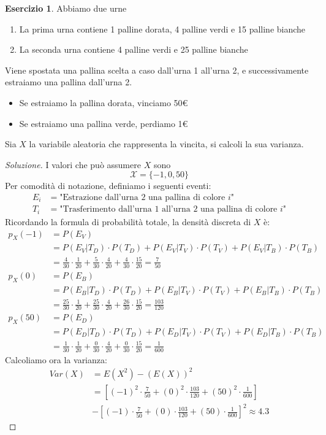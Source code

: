 \documentclass{article}
\theoremstyle{plain}
\theoremstyle{definition}
\newtheorem{esercizio}{Esercizio}[section]
\theoremstyle{remark}
\newenvironment{soluzione}
	{\renewcommand\qedsymbol{$\mathwitch*$}\begin{proof}[Soluzione]}
	{\end{proof}}
\renewcommand{\qedsymbol}{$\mathrightghost$}
\begin{document}
\begin{esercizio}
	Abbiamo due urne
	\begin{enumerate}
		\item La prima urna contiene 1 palline dorata, 4 palline verdi e 15 palline bianche
		\item La seconda urna contiene 4 palline verdi e 25 palline bianche
	\end{enumerate}
	Viene spostata una pallina scelta a caso dall'urna 1 all'urna 2, e successivamente estraiamo una pallina dall'urna 2.
	\begin{itemize}
		\item Se estraiamo la pallina dorata, vinciamo 50€
		\item Se estraiamo una pallina verde, perdiamo 1€
	\end{itemize}
	Sia $X$ la variabile aleatoria che rappresenta la vincita, si calcoli la sua varianza.
	\begin{soluzione}
		I valori che può assumere $X$ sono
		\begin{equation*}
			\mathcal{X}=\{-1,0,50\}
		\end{equation*}
		Per comodità di notazione, definiamo i seguenti eventi:
		\begin{align*}
			E_i&=\text{"Estrazione dall'urna 2 una pallina di colore $i$"}\\
			T_i&=\text{"Trasferimento dall'urna 1 all'urna 2 una pallina di colore $i$"}
		\end{align*}
		Ricordando la formula di probabilità totale, la densità discreta di $X$ è:
		\begin{align*}
			p_X(-1)&=P(E_V)\\
			&=P(E_V|T_D)\cdot P(T_D)+P(E_V|T_V)\cdot P(T_V)+P(E_V|T_B)\cdot P(T_B)\\
			&=\frac{4}{30}\cdot\frac{1}{20}+\frac{5}{30}\cdot\frac{4}{20}+\frac{4}{30}\cdot\frac{15}{20}=\frac{7}{50}\\
			p_X(0)&=P(E_B)\\
			&=P(E_B|T_D)\cdot P(T_D)+P(E_B|T_V)\cdot P(T_V)+P(E_B|T_B)\cdot P(T_B)\\
			&=\frac{25}{30}\cdot\frac{1}{20}+\frac{25}{30}\cdot\frac{4}{20}+\frac{26}{30}\cdot\frac{15}{20}=\frac{103}{120}\\
			p_X(50)&=P(E_D)\\
			&=P(E_D|T_D)\cdot P(T_D)+P(E_D|T_V)\cdot P(T_V)+P(E_D|T_B)\cdot P(T_B)\\
			&=\frac{1}{30}\cdot\frac{1}{20}+\frac{0}{30}\cdot\frac{4}{20}+\frac{0}{30}\cdot\frac{15}{20}=\frac{1}{600}
		\end{align*}
		Calcoliamo ora la varianza:
		\begin{align*}
			Var(X)&=E(X^2)-(E(X))^2\\
			&=\left[(-1)^2\cdot\frac{7}{50}+(0)^2\cdot\frac{103}{120}+(50)^2\cdot\frac{1}{600}\right]\\
			&-\left[(-1)\cdot\frac{7}{50}+(0)\cdot\frac{103}{120}+(50)\cdot\frac{1}{600}\right]^2\approx4.3
		\end{align*}
	\end{soluzione}
\end{esercizio}
\end{document}
